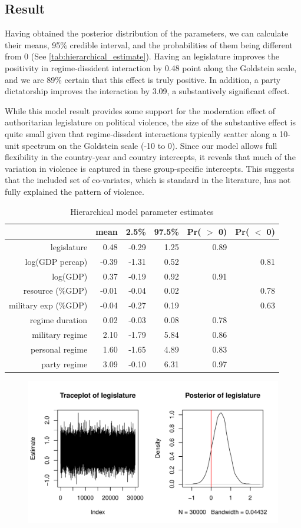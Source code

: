\subsection{Result}

Having obtained the posterior distribution of the parameters, we can calculate their means, 95\% credible interval, and the probabilities of them being different from 0 (See \autoref{tab:hierarchical_estimate}). Having an legislature improves the positivity in regime-dissident interaction by 0.48 point along the Goldstein scale, and we are 89\% certain that this effect is truly positive. In addition, a party dictatorship improves the interaction by 3.09, a substantively significant effect.

While this model result provides some support for the moderation effect of authoritarian legislature on political violence, the size of the substantive effect is quite small given that regime-dissdent interactions typically scatter along a 10-unit spectrum on the Goldstein scale (-10 to 0). Since our model allows full flexibility in the country-year and country intercepts, it reveals that much of the variation in violence is captured in these group-specific intercepts. This suggests that the included set of co-variates, which is standard in the literature, has not fully explained the pattern of violence.

\begin{table}[H]
\centering
\begin{tabular}{rrrrrr}
  \hline
 & mean & 2.5\% & 97.5\% & Pr( $>$ 0) & Pr( $<$ 0) \\ 
  \hline
legislature & 0.48 & -0.29 & 1.25 & 0.89 &  \\ 
  log(GDP percap) & -0.39 & -1.31 & 0.52 &  & 0.81 \\ 
  log(GDP) & 0.37 & -0.19 & 0.92 & 0.91 &  \\ 
  resource (\%GDP) & -0.01 & -0.04 & 0.02 &  & 0.78 \\ 
  military exp (\%GDP) & -0.04 & -0.27 & 0.19 &  & 0.63 \\ 
  regime duration & 0.02 & -0.03 & 0.08 & 0.78 &  \\ 
  military regime & 2.10 & -1.79 & 5.84 & 0.86 &  \\ 
  personal regime & 1.60 & -1.65 & 4.89 & 0.83 &  \\ 
  party regime & 3.09 & -0.10 & 6.31 & 0.97 &  \\ 
   \hline
\end{tabular}
\caption{Hierarchical model parameter estimates}
\label{tab:hierarchical_estimate}
\end{table}

\begin{figure}[ht]
    \centering
    \includegraphics[width=\textwidth]{../fig/mcmc_legis}
    \label{fig:mcmc_legis}
\end{figure}
